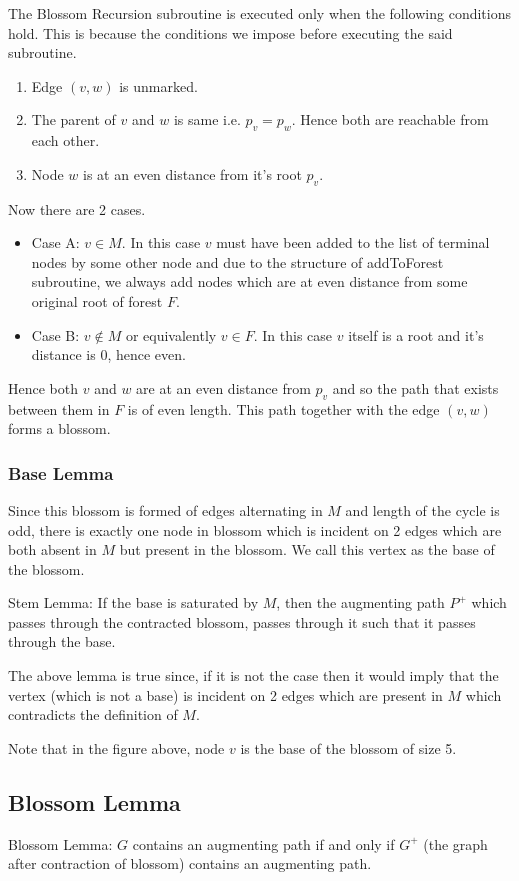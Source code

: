The Blossom Recursion subroutine is executed only when the following conditions hold. This is because the conditions we impose before executing the said subroutine.
\begin{enumerate}
    \item Edge $(v, w)$ is unmarked.
    \item The parent of $v$ and $w$ is same i.e. $p_v = p_w$. Hence both are reachable from each other.
    \item Node $w$ is at an even distance from it's root $p_v$.
\end{enumerate}
Now there are 2 cases.
\begin{itemize}
    \item Case A: $v \in M$. 
        In this case $v$ must have been added to the list of terminal nodes by some other node and due to the structure of addToForest subroutine, we always add nodes which are at even distance from some original root of forest $F$. 
    \item Case B: $v \notin M$ or equivalently $v \in F$.
        In this case $v$ itself is a root and it's distance is 0, hence even.
\end{itemize}
Hence both $v$ and $w$ are at an even distance from $p_v$ and so the path that exists between them in $F$ is of even length. This path together with the edge $(v, w)$ forms a blossom.

\subsubsection{Base Lemma}
Since this blossom is formed of edges alternating in $M$ and length of the cycle is odd, there is exactly one node in blossom which is incident on 2 edges which are both absent in $M$ but present in the blossom. We call this vertex as the base of the blossom.

Stem Lemma: If the base is saturated by $M$, then the augmenting path $P^+$ which passes through the contracted blossom, passes through it such that it passes through the base.

The above lemma is true since, if it is not the case then it would imply that the vertex (which is not a base) is incident on 2 edges which are present in $M$ which contradicts the definition of $M$.

Note that in the figure above, node $v$ is the base of the blossom of size 5.

\subsection{Blossom Lemma}
Blossom Lemma: $G$ contains an augmenting path if and only if $G^+$ (the graph after contraction of blossom) contains an augmenting path.

